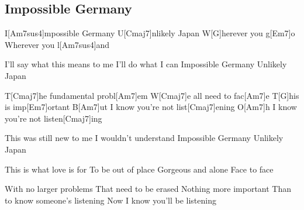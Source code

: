 \subsection*{Impossible Germany   }
\begin{guitar}
I[Am7sus4]mpossible Germany 
U[Cmaj7]nlikely Japan
W[G]herever you g[Em7]o
Wherever you l[Am7sus4]and\qquad\qquad\qquad[Am7]{}

I’ll say what this means to me
I’ll do what I can
Impossible Germany
Unlikely Japan



T[Cmaj7]he fundamental probl[Am7]em
W[Cmaj7]e all need to fac[Am7]e
T[G]his is imp[Em7]ortant
B[Am7]ut I know you’re not list[Cmaj7]ening
O[Am7]h I know you’re not listen[Cmaj7]ing



This was still new to me
I wouldn’t understand
Impossible Germany 
Unlikely Japan

This is what love is for
To be out of place
Gorgeous and alone
Face to face



With no larger problems
That need to be erased
Nothing more important 
Than to know someone’s listening
Now I know you’ll be listening
\end{guitar}
